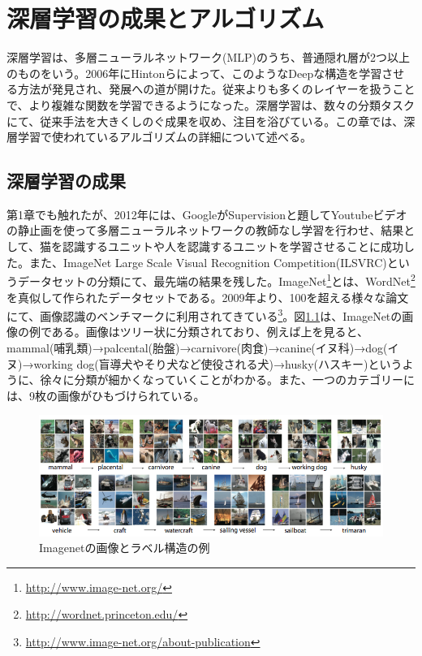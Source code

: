 \chapter{深層学習の成果とアルゴリズム}
深層学習は、多層ニューラルネットワーク(MLP)のうち、普通隠れ層が2つ以上のものをいう。2006年にHintonらによって、このようなDeepな構造を学習させる方法が発見され、発展への道が開けた\cite{hinton2006a-fast, hinton2006reducing}。従来よりも多くのレイヤーを扱うことで、より複雑な関数を学習できるようになった。深層学習は、数々の分類タスクにて、従来手法を大きくしのぐ成果を収め、注目を浴びている。この章では、深層学習で使われているアルゴリズムの詳細について述べる。
\section{深層学習の成果}
第1章でも触れたが、2012年には、GoogleがSupervisionと題してYoutubeビデオの静止画を使って多層ニューラルネットワークの教師なし学習を行わせ、結果として、猫を認識するユニットや人を認識するユニットを学習させることに成功した。また、ImageNet Large Scale Visual Recognition Competition(ILSVRC)というデータセット\cite{deng2009imagenet:}の分類にて、最先端の結果を残した。ImageNet\footnote{\url{http://www.image-net.org/}}とは、WordNet\footnote{\url{http://wordnet.princeton.edu/}}を真似して作られたデータセットである。2009年より、100を超える様々な論文にて、画像認識のベンチマークに利用されてきている\footnote{\url{http://www.image-net.org/about-publication}}。図\ref{c3_imagenet}は、ImageNetの画像の例である。画像はツリー状に分類されており、例えば上を見ると、mammal(哺乳類)→palcental(胎盤)→carnivore(肉食)→canine(イヌ科)→dog(イヌ)→working dog(盲導犬やそり犬など使役される犬)→husky(ハスキー)というように、徐々に分類が細かくなっていくことがわかる。また、一つのカテゴリーには、9枚の画像がひもづけられている。\par
\begin{figure}[tbp]
 \begin{center}
  \includegraphics[width=120mm]{img/c3/imagenet}
 \end{center}
 \caption{Imagenetの画像とラベル構造の例}
 \label{c3_imagenet}
\end{figure}
